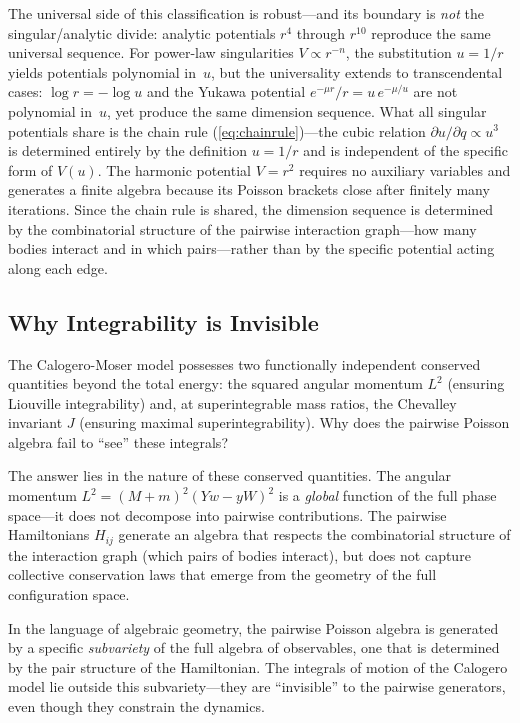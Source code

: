 \documentclass[aps,prl,twocolumn,superscriptaddress,showpacs]{revtex4-2}
\begin{document}
The universal side of this classification is robust---and its boundary
is \emph{not} the singular/analytic divide: analytic potentials $r^4$
through $r^{10}$ reproduce the same universal sequence.  For power-law
singularities $V \propto r^{-n}$,
the substitution $u = 1/r$ yields potentials polynomial in~$u$, but
the universality extends to transcendental cases: $\log r = -\log u$
and the Yukawa potential $e^{-\mu r}/r = u\,e^{-\mu/u}$ are not
polynomial in~$u$, yet produce the same dimension sequence.  What
all singular potentials share is the chain rule
(\ref{eq:chainrule})---the cubic relation $\partial u/\partial q
\propto u^3$ is determined entirely by the definition $u = 1/r$ and
is independent of the specific form of $V(u)$.  The harmonic
potential $V = r^2$ requires no auxiliary variables and generates a
finite algebra because its Poisson brackets close after finitely many
iterations.  Since the chain rule is shared, the dimension sequence
is determined by the combinatorial structure of the pairwise
interaction graph---how many bodies interact and in which
pairs---rather than by the specific potential acting along each edge.

\subsection{Why Integrability is Invisible}

The Calogero-Moser model possesses two functionally independent
conserved quantities beyond the total energy: the squared angular
momentum $L^2$ (ensuring Liouville integrability) and, at
superintegrable mass ratios, the Chevalley invariant $J$ (ensuring
maximal superintegrability).  Why does the pairwise Poisson algebra
fail to ``see'' these integrals?

The answer lies in the nature of these conserved quantities.  The
angular momentum $L^2 = (M+m)^2(Yw - yW)^2$ is a \emph{global}
function of the full phase space---it does not decompose into pairwise
contributions.  The pairwise Hamiltonians $H_{ij}$ generate an algebra
that respects the combinatorial structure of the interaction graph
(which pairs of bodies interact), but does not capture collective
conservation laws that emerge from the geometry of the full
configuration space.

In the language of algebraic geometry, the pairwise Poisson algebra
is generated by a specific \emph{subvariety} of the full algebra of
observables, one that is determined by the pair structure of the
Hamiltonian.  The integrals of motion of the Calogero model lie
outside this subvariety---they are ``invisible'' to the pairwise
generators, even though they constrain the dynamics.
\end{document}
